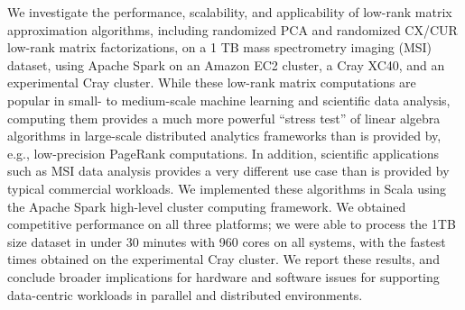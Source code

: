 We investigate the performance, scalability, and applicability of low-rank matrix approximation algorithms, including randomized PCA and randomized CX/CUR low-rank matrix factorizations, on a 1 TB mass spectrometry imaging (MSI) dataset, using Apache Spark on an Amazon EC2 cluster, a Cray XC40, and an experimental Cray cluster.  
While these low-rank matrix computations are popular in small- to medium-scale machine learning and scientific data analysis, computing them provides a much more powerful ``stress test'' of linear algebra algorithms in large-scale distributed analytics frameworks than is provided by, e.g., low-precision PageRank computations.
In addition, scientific applications such as MSI data analysis provides a very different use case 
than is provided by typical commercial workloads.
We implemented these algorithms in Scala using the Apache Spark high-level cluster computing framework.  
We obtained competitive performance on all three platforms; we were able to process the 1TB size dataset in under 30 minutes with 960 cores on all systems, with the fastest times obtained on the experimental Cray cluster.
We report these results, and conclude broader implications for hardware and software issues for supporting data-centric workloads in parallel and distributed environments.  

